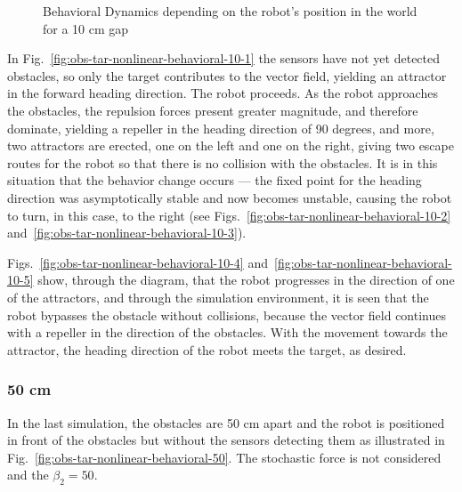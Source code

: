 \begin{figure}[htb!]
\begin{subfigure}{.45\textwidth}
    \caption{}%
    \label{fig:obs-tar-nonlinear-behavioral-10-6}
    \end{subfigure}
    \caption{Behavioral Dynamics depending on the robot's position in the world for a 10 cm gap}%
    \label{fig:obs-tar-nonlinear-behavioral-10}
  \end{figure}

In Fig.~\ref{fig:obs-tar-nonlinear-behavioral-10-1} the sensors have not yet
detected obstacles, so only the target contributes to the vector field, yielding
an attractor in the forward heading direction. The robot proceeds. As the
robot approaches the obstacles, the repulsion forces present greater magnitude,
and therefore dominate, yielding a repeller in the heading direction of 90
degrees, and more, two attractors are erected, one on the left and one on the
right, giving two escape routes for the robot so that there is no collision with
the obstacles. It is in this situation that the behavior change occurs ---
the fixed point for the heading direction was asymptotically stable and now
becomes unstable, causing the robot to turn, in this case, to the
right (see Figs.~\ref{fig:obs-tar-nonlinear-behavioral-10-2} and~\ref{fig:obs-tar-nonlinear-behavioral-10-3}).

Figs.~\ref{fig:obs-tar-nonlinear-behavioral-10-4} and~\ref{fig:obs-tar-nonlinear-behavioral-10-5} show, through the diagram, that the robot progresses in the
direction of one of the attractors, and through the simulation environment, it
is seen that the robot bypasses the obstacle without collisions, because the
vector field continues with a repeller in the direction of the obstacles. With
the movement towards the attractor, the heading direction of the robot meets
the target, as desired.
%
\subsubsection{50 cm}%
\label{sec:Different-gaps-50cm}
In the last simulation, the obstacles are 50 cm apart and the robot is
positioned in front of the obstacles but without the sensors detecting them as
illustrated in Fig.~\ref{fig:obs-tar-nonlinear-behavioral-50}. 
The stochastic force is not considered and the $\beta _{2} = 50$.

